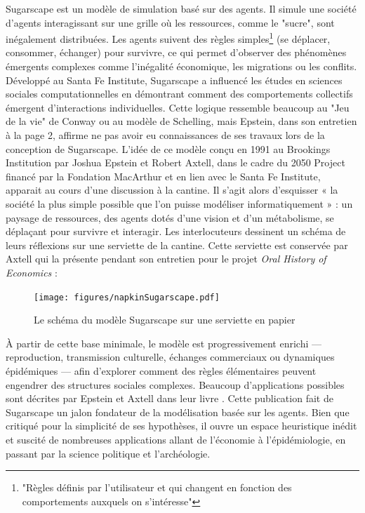 Sugarscape est un modèle de simulation basé sur des agents. Il simule une société d'agents interagissant sur une grille où les ressources, comme le "sucre", sont inégalement distribuées. Les agents suivent des règles simples\footnote{"Règles définis par l'utilisateur et qui changent en fonction des comportements auxquels on s'intéresse"} (se déplacer, consommer, échanger) pour survivre, ce qui permet d'observer des phénomènes émergents complexes comme l'inégalité économique, les migrations ou les conflits. Développé au Santa Fe Institute, Sugarscape a influencé les études en sciences sociales computationnelles en démontrant comment des comportements collectifs émergent d'interactions individuelles. Cette logique ressemble beaucoup au "Jeu de la vie" de Conway ou au modèle de Schelling, mais Epstein, dans son entretien \cite{epsteinInterviewJoshuaEpstein2024} à la page 2, affirme ne pas avoir eu connaissances de ses travaux lors de la conception de Sugarscape.
L’idée de ce modèle conçu en 1991 au Brookings Institution par Joshua Epstein et Robert Axtell, dans le cadre du 2050 Project financé par la Fondation MacArthur et en lien avec le Santa Fe Institute, apparait au cours d’une discussion à la cantine. Il s’agit alors d’esquisser « la société la plus simple possible que l’on puisse modéliser informatiquement » : un paysage de ressources, des agents dotés d’une vision et d’un métabolisme, se déplaçant pour survivre et interagir. Les interlocuteurs dessinent un schéma de leurs réflexions sur une serviette de la cantine. Cette serviette est conservée par Axtell qui la présente pendant son entretien pour le projet \textit{Oral History of Economics}\cite{axtellInterviewRobertAxtell2025} :

\begin{figure}[h]
  \centering
  \texttt{[image: figures/napkinSugarscape.pdf]}
  \caption{Le schéma du modèle Sugarscape sur une serviette en papier}
  \label{fig:graph_napkin_Sugarscape}
\end{figure}


À partir de cette base minimale, le modèle est progressivement enrichi — reproduction, transmission culturelle, échanges commerciaux ou dynamiques épidémiques — afin d’explorer comment des règles élémentaires peuvent engendrer des structures sociales complexes. Beaucoup d'applications possibles sont décrites par Epstein et Axtell dans leur livre \cite{epsteinGrowingArtificialSocieties1996}. Cette publication fait de Sugarscape un jalon fondateur de la modélisation basée sur les agents. Bien que critiqué pour la simplicité de ses hypothèses, il ouvre un espace heuristique inédit et suscité de nombreuses applications allant de l’économie à l’épidémiologie, en passant par la science politique et l’archéologie.



